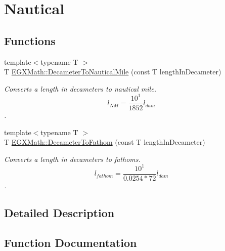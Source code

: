 \hypertarget{group___e_g_x_math-_conversions-_length_conversions-_s_i-_decameter-_nautical}{}\section{Nautical}
\label{group___e_g_x_math-_conversions-_length_conversions-_s_i-_decameter-_nautical}
\subsection*{Functions}
\begin{DoxyCompactItemize}
\item 
{\footnotesize template$<$typename T $>$ }\\T \mbox{\hyperlink{group___e_g_x_math-_conversions-_length_conversions-_s_i-_decameter-_nautical_ga099c662953d7c82d538755bd699993b1}{E\+G\+X\+Math\+::\+Decameter\+To\+Nautical\+Mile}} (const T length\+In\+Decameter)
\begin{DoxyCompactList}\small\item\em Converts a length in decameters to nautical mile. \[ l_{NM}= \frac{10^{1}}{1852} l_{dam} \]. \end{DoxyCompactList}\item 
{\footnotesize template$<$typename T $>$ }\\T \mbox{\hyperlink{group___e_g_x_math-_conversions-_length_conversions-_s_i-_decameter-_nautical_ga26e58af8b0bdc9bfb22635741a498217}{E\+G\+X\+Math\+::\+Decameter\+To\+Fathom}} (const T length\+In\+Decameter)
\begin{DoxyCompactList}\small\item\em Converts a length in decameters to fathoms. \[ l_{fathom}= \frac{10^{1}}{0.0254 * 72} l_{dam} \]. \end{DoxyCompactList}\end{DoxyCompactItemize}


\subsection{Detailed Description}


\subsection{Function Documentation}
\mbox{\label{group___e_g_x_math-_conversions-_length_conversions-_s_i-_decameter-_nautical_ga26e58af8b0bdc9bfb22635741a498217}} 

